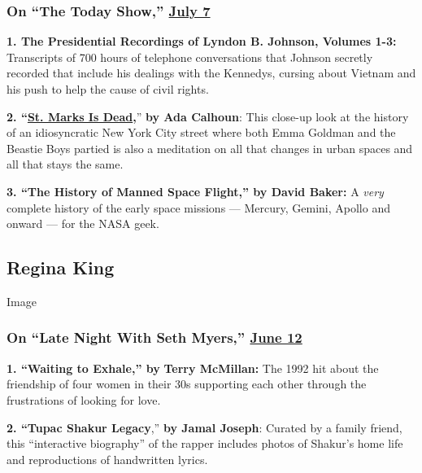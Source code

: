 \hypertarget{on-the-today-show-july-7}{%
\subsubsection{\texorpdfstring{On ``The Today Show,''
\href{https://www.youtube.com/watch?v=bzGYqX81Wu8}{July
7}}{On ``The Today Show,'' July 7}}\label{on-the-today-show-july-7}}

\textbf{1. The Presidential Recordings of Lyndon B. Johnson, Volumes
1-3:} Transcripts of 700 hours of telephone conversations that Johnson
secretly recorded that include his dealings with the Kennedys, cursing
about Vietnam and his push to help the cause of civil rights.

\textbf{2.
``\href{https://www.nytimes.com/2015/12/06/books/review/st-marks-is-dead-by-ada-calhoun.html}{St.
Marks Is Dead},}'' \textbf{by Ada Calhoun}: This close-up look at the
history of an idiosyncratic New York City street where both Emma Goldman
and the Beastie Boys partied is also a meditation on all that changes in
urban spaces and all that stays the same.

\textbf{3. ``The History of Manned Space Flight,'' by David Baker:} A
\emph{very} complete history of the early space missions --- Mercury,
Gemini, Apollo and onward --- for the NASA geek.

\hypertarget{regina-king}{%
\subsection{Regina King}\label{regina-king}}

Image

\hypertarget{on-late-night-with-seth-myers-june-12}{%
\subsubsection{\texorpdfstring{On ``Late Night With Seth Myers,''
\href{https://www.youtube.com/watch?v=2tSejiYx5_g}{June
12}}{On ``Late Night With Seth Myers,'' June 12}}\label{on-late-night-with-seth-myers-june-12}}

\textbf{1. ``Waiting to Exhale,'' by} \textbf{Terry McMillan:} The 1992
hit about the friendship of four women in their 30s supporting each
other through the frustrations of looking for love.

\textbf{2. ``Tupac Shakur Legacy},'' \textbf{by Jamal Joseph}: Curated
by a family friend, this ``interactive biography'' of the rapper
includes photos of Shakur's home life and reproductions of handwritten
lyrics.

